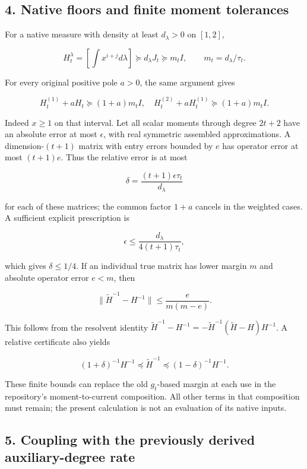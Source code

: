 \subsection{4. Native floors and finite moment
tolerances}\label{native-floors-and-finite-moment-tolerances}

For a native measure with density at least \(d_\lambda>0\) on \([1,2]\),

\[
 H_t^\lambda=\left[\int x^{i+j}d\lambda\right]\succeq
 d_\lambda J_t\succeq m_tI,\qquad m_t=d_\lambda/\tau_t.
\]

For every original positive pole \(a>0\), the same argument gives

\[
 H_t^{(1)}+aH_t\succeq(1+a)m_tI,
\quad H_t^{(2)}+aH_t^{(1)}\succeq(1+a)m_tI.
\]

Indeed \(x\ge1\) on that interval. Let all scalar moments through degree
\(2t+2\) have an absolute error at most \(\epsilon\), with real
symmetric assembled approximations. A dimension-\((t+1)\) matrix with
entry errors bounded by \(e\) has operator error at most \((t+1)e\).
Thus the relative error is at most

\[
 \boxed{\delta=\frac{(t+1)\epsilon\tau_t}{d_\lambda}}
\]

for each of these matrices; the common factor \(1+a\) cancels in the
weighted cases. A sufficient explicit prescription is

\[
 \boxed{\epsilon\le\frac{d_\lambda}{4(t+1)\tau_t},}
\]

which gives \(\delta\le1/4\). If an individual true matrix has lower
margin \(m\) and absolute operator error \(e<m\), then

\[
 \|\widetilde H^{-1}-H^{-1}\|\le\frac{e}{m(m-e)}.
\]

This follows from the resolvent identity
\(\widetilde H^{-1}-H^{-1}=-\widetilde H^{-1}(\widetilde H-H)H^{-1}\). A
relative certificate also yields

\[
 (1+\delta)^{-1}H^{-1}\preceq\widetilde H^{-1}
 \preceq(1-\delta)^{-1}H^{-1}.
\]

These finite bounds can replace the old \(g_t\)-based margin at each use
in the repository's moment-to-current composition. All other terms in
that composition must remain; the present calculation is not an
evaluation of its native inputs.

\subsection{5. Coupling with the previously derived auxiliary-degree
rate}\label{coupling-with-the-previously-derived-auxiliary-degree-rate}

